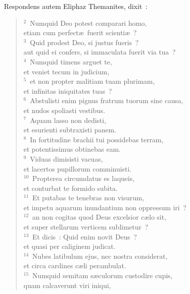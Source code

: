 \lettrine[lines=10,image=true,loversize=0.05,lraise=-0.03]{R}{}espondens autem Eliphaz Themanites, dixit~:
\begin{flushleft}\begin{verse}\vspace{6pt}${}^{2}$~Numquid Deo potest comparari homo,\\ etiam cum perfect\ae\ fuerit scienti\ae~?\\
${}^{3}$~Quid prodest Deo, si justus fueris~?\\ aut quid ei confers, si immaculata fuerit via tua~?\\
${}^{4}$~Numquid timens arguet te,\\ et veniet tecum in judicium,\\
${}^{5}$~et non propter malitiam tuam plurimam,\\ et infinitas iniquitates tuas~?\\
${}^{6}$~Abstulisti enim pignus fratrum tuorum sine causa,\\ et nudos spoliasti vestibus.\\
${}^{7}$~Aquam lasso non dedisti,\\ et esurienti subtraxisti panem.\\
${}^{8}$~In fortitudine brachii tui possidebas terram,\\ et potentissimus obtinebas eam.\\
${}^{9}$~Viduas dimisisti vacuas,\\ et lacertos pupillorum comminuisti.\\
${}^{10}$~Propterea circumdatus es laqueis,\\ et conturbat te formido subita.\\
${}^{11}$~Et putabas te tenebras non visurum,\\ et impetu aquarum inundantium non oppressum iri~?\\
${}^{12}$~an non cogitas quod Deus excelsior c\ae lo sit,\\ et super stellarum verticem sublimetur~?\\
${}^{13}$~Et dicis~: Quid enim novit Deus~?\\ et quasi per caliginem judicat.\\
${}^{14}$~Nubes latibulum ejus, nec nostra considerat,\\ et circa cardines c\ae li perambulat.\\
${}^{15}$~Numquid semitam s\ae culorum custodire cupis,\\ quam calcaverunt viri iniqui,\\

\end{verse}
\end{flushleft}
